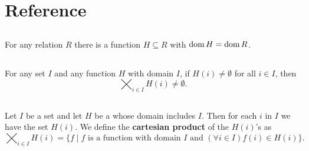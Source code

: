 \documentclass{report}
\begin{document}

\tableofcontents

\begingroup
\renewcommand\thechapter{R}
\setcounter{chapter}{0}
\addtocounter{chapter}{-1}

\chapter{Reference}%

\section{}%

For any relation $R$ there is a function $H \subseteq R$ with
  $\mathop{\text{dom}}{H} = \mathop{\text{dom}}{R}$.

\begin{axiom}


\end{axiom}

\section{}%

For any set $I$ and any function $H$ with domain $I$, if $H(i) \neq \emptyset$
  for all $i \in I$, then $$\bigtimes_{i \in I} H(i) \neq \emptyset.$$

\begin{axiom}


\end{axiom}

\section{}%

Let $I$ be a set and let $H$ be a  whose domain includes $I$.
Then for each $i$ in $I$ we have the set $H(i)$.
We define the \textbf{cartesian product} of the $H(i)$'s as
  $$\bigtimes_{i \in I} H(i) = \{f \mid
    f \text{ is a function with domain } I \text{ and }
      (\forall i \in I) f(i) \in H(i)\}.$$
\end{document}
